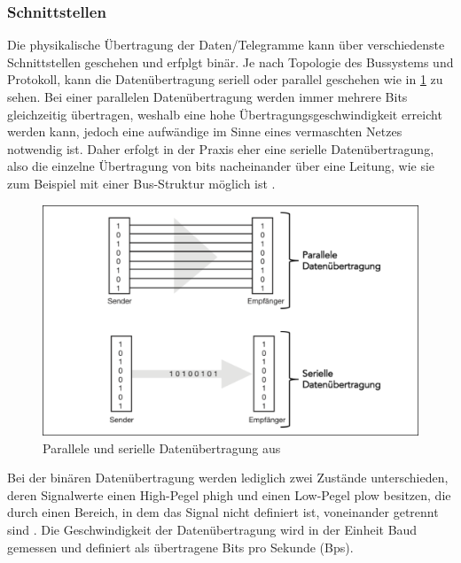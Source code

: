 \subsubsection{Schnittstellen}
\label{sub:schnitt}

Die physikalische Übertragung der Daten/Telegramme kann über verschiedenste Schnittstellen geschehen und erfplgt binär. Je nach Topologie des Bussystems und Protokoll, kann die Datenübertragung seriell oder parallel geschehen wie in \ref{fig:seriell} zu sehen. Bei einer parallelen Datenübertragung werden immer mehrere Bits gleichzeitig übertragen, weshalb eine hohe Übertragungsgeschwindigkeit erreicht werden kann, jedoch eine aufwändige im Sinne eines vermaschten Netzes notwendig ist. Daher erfolgt in der Praxis eher eine serielle Datenübertragung, also die einzelne Übertragung von bits nacheinander über eine Leitung, wie sie zum Beispiel mit einer Bus-Struktur möglich ist \cite[S.~13]{sch08}.


\begin{figure}
\centering
\includegraphics[width=\textwidth]{abbildungen/20160314_seriell}
\caption[Parallele und serielle Datenübertragung]{Parallele und serielle Datenübertragung aus \cite[S.~13]{sch08}}
\label{fig:seriell}
\end{figure}


Bei der binären Datenübertragung werden lediglich zwei Zustände unterschieden, deren Signalwerte einen High-Pegel \gls{phigh} und einen Low-Pegel \gls{plow} besitzen, die durch einen Bereich, in dem das Signal nicht definiert ist, voneinander getrennt sind \cite[S.~9]{sch08}.
Die Geschwindigkeit der Datenübertragung wird in der Einheit Baud gemessen und definiert als übertragene Bits pro Sekunde (Bps)\cite[S.~22]{sch08}.

